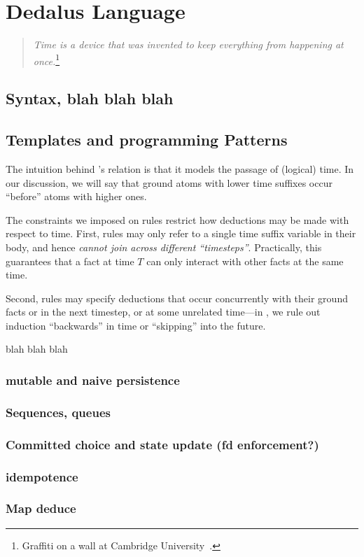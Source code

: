 \section{Dedalus Language}

\begin{quote}
%
\emph{Time is a device that was invented to keep everything from
happening at once.}\footnote{Graffiti on a wall at Cambridge
University~\cite{scheme}.}
%
\end{quote} 

\subsection{Syntax, blah  blah blah}

\subsection{Templates and programming Patterns}

The intuition behind \lang's  relation is that it models the
passage of (logical) time.  In our discussion, we will say that ground atoms
with lower time suffixes occur ``before'' atoms with higher ones.

The constraints we imposed on \slang rules restrict how deductions may be made
with respect to time.  First, rules may only refer to a single time suffix variable in
their body, and hence {\em cannot join across different ``timesteps''}.  Practically, this guarantees that a fact at time $T$ can only interact with other facts at the same time.

Second, rules may specify
deductions that occur concurrently with their ground facts or in the next
timestep, or at some unrelated time---in \lang, we rule out induction ``backwards'' in time or
``skipping'' into the future.

blah blah blah

\subsubsection{mutable and naive persistence}


\subsubsection{Sequences, queues}
\subsubsection{Committed choice and state update (fd enforcement?)}
\subsubsection{idempotence}
\subsubsection{Map deduce}
